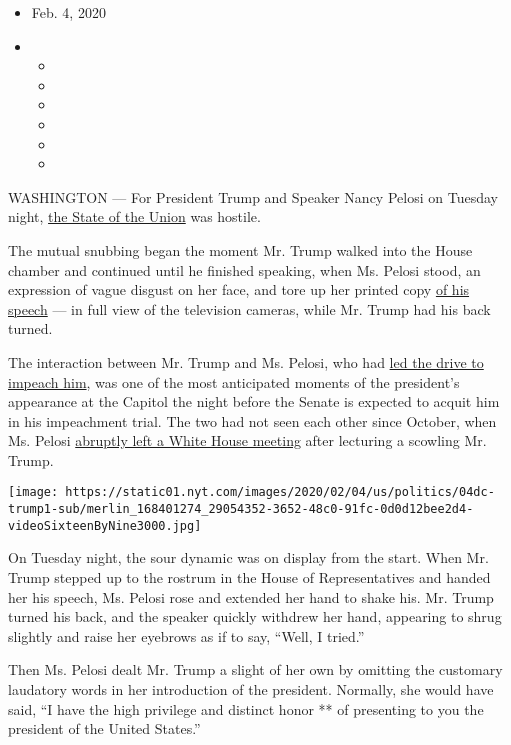 \begin{itemize}
\item
  Feb. 4, 2020
\item
  \begin{itemize}
  \item
  \item
  \item
  \item
  \item
  \item
  \end{itemize}
\end{itemize}

WASHINGTON --- For President Trump and Speaker Nancy Pelosi on Tuesday
night,
\href{https://www.nytimes.com/2020/02/05/us/politics/trump-state-of-the-union.html}{the
State of the Union} was hostile.

The mutual snubbing began the moment Mr. Trump walked into the House
chamber and continued until he finished speaking, when Ms. Pelosi stood,
an expression of vague disgust on her face, and tore up her printed copy
\href{https://www.nytimes.com/2020/02/05/us/politics/four-more-years-chant-trump.html}{of
his speech} --- in full view of the television cameras, while Mr. Trump
had his back turned.

The interaction between Mr. Trump and Ms. Pelosi, who had
\href{https://www.nytimes.com/2019/09/24/us/politics/democrats-impeachment-trump.html}{led
the drive to impeach him}, was one of the most anticipated moments of
the president's appearance at the Capitol the night before the Senate is
expected to acquit him in his impeachment trial. The two had not seen
each other since October, when Ms. Pelosi
\href{https://www.nytimes.com/2019/10/18/us/politics/trump-pelosi-photo.html}{abruptly
left a White House meeting} after lecturing a scowling Mr. Trump.

\texttt{[image: https://static01.nyt.com/images/2020/02/04/us/politics/04dc-trump1-sub/merlin\_168401274\_29054352-3652-48c0-91fc-0d0d12bee2d4-videoSixteenByNine3000.jpg]}

On Tuesday night, the sour dynamic was on display from the start. When
Mr. Trump stepped up to the rostrum in the House of Representatives and
handed her his speech, Ms. Pelosi rose and extended her hand to shake
his. Mr. Trump turned his back, and the speaker quickly withdrew her
hand, appearing to shrug slightly and raise her eyebrows as if to say,
``Well, I tried.''

Then Ms. Pelosi dealt Mr. Trump a slight of her own by omitting the
customary laudatory words in her introduction of the president.
Normally, she would have said, ``I have the high privilege and distinct
honor ** of presenting to you the president of the United States.''

